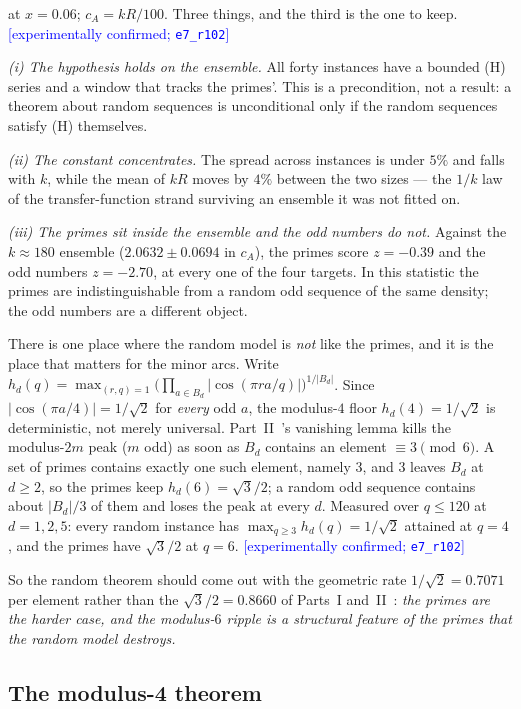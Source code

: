 \documentclass[11pt,a4paper]{article}
\theoremstyle{plain}
\theoremstyle{definition}
\theoremstyle{remark}
\newcommand{\STATUS}[1]{\textcolor{blue}{\textsf{[#1]}}}
\begin{document}
\noindent
at $x=0.06$; $c_A=kR/100$. Three things, and the third is the one to keep.
\STATUS{experimentally confirmed; \texttt{e7\_r102}}

\emph{(i) The hypothesis holds on the ensemble.} All forty instances have a bounded (H)
series and a window that tracks the primes'. This is a precondition, not a result: a theorem
about random sequences is unconditional only if the random sequences satisfy (H) themselves.

\emph{(ii) The constant concentrates.} The spread across instances is under $5\%$ and falls
with $k$, while the mean of $kR$ moves by $4\%$ between the two sizes --- the $1/k$ law of
the transfer-function strand surviving an ensemble it was not fitted on.

\emph{(iii) The primes sit inside the ensemble and the odd numbers do not.} Against the
$k\approx180$ ensemble ($2.0632\pm0.0694$ in $c_A$), the primes score $z=-0.39$ and the odd
numbers $z=-2.70$, at every one of the four targets. In this statistic the primes are
indistinguishable from a random odd sequence of the same density; the odd numbers are a
different object.

There is one place where the random model is \emph{not} like the primes, and it is the place
that matters for the minor arcs. Write
$h_d(q)=\max_{(r,q)=1}\bigl(\prod_{a\in B_d}|\cos(\pi ra/q)|\bigr)^{1/|B_d|}$.
Since $|\cos(\pi a/4)|=1/\sqrt2$ for \emph{every} odd $a$, the modulus-$4$ floor
$h_d(4)=1/\sqrt2$ is deterministic, not merely universal. Part~II~\cite{P2}'s vanishing lemma kills the
modulus-$2m$ peak ($m$ odd) as soon as $B_d$ contains an element $\equiv3\pmod 6$. A set of
primes contains exactly one such element, namely $3$, and $3$ leaves $B_d$ at $d\ge2$, so the
primes keep $h_d(6)=\sqrt3/2$; a random odd sequence contains about $|B_d|/3$ of them and
loses the peak at every $d$. Measured over $q\le120$ at $d=1,2,5$: every random instance has
$\max_{q\ge3}h_d(q)=1/\sqrt2$ attained at $q=4$, and the primes have $\sqrt3/2$ at $q=6$.
\STATUS{experimentally confirmed; \texttt{e7\_r102}}

\noindent
So the random theorem should come out with the geometric rate $1/\sqrt2=0.7071$ per element
rather than the $\sqrt3/2=0.8660$ of Parts~I and~II~\cite{P1,P2}: \emph{the primes are the harder case, and
the modulus-$6$ ripple is a structural feature of the primes that the random model destroys.}

\subsection{The modulus-4 theorem}\label{sec:modfour}
\end{document}
